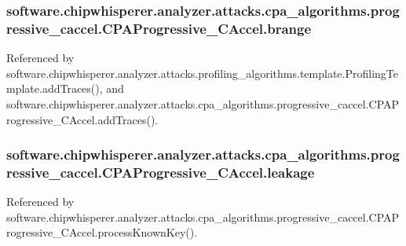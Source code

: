 \subsubsection[{brange}]{\setlength{\rightskip}{0pt plus 5cm}software.\+chipwhisperer.\+analyzer.\+attacks.\+cpa\+\_\+algorithms.\+progressive\+\_\+caccel.\+C\+P\+A\+Progressive\+\_\+\+C\+Accel.\+brange}\label{classsoftware_1_1chipwhisperer_1_1analyzer_1_1attacks_1_1cpa__algorithms_1_1progressive__caccel_1_1CPAProgressive__CAccel_a11fa06dd5d4fb9ad43dfd86c99d4bc9c}


Referenced by software.\+chipwhisperer.\+analyzer.\+attacks.\+profiling\+\_\+algorithms.\+template.\+Profiling\+Template.\+add\+Traces(), and software.\+chipwhisperer.\+analyzer.\+attacks.\+cpa\+\_\+algorithms.\+progressive\+\_\+caccel.\+C\+P\+A\+Progressive\+\_\+\+C\+Accel.\+add\+Traces().

\hypertarget{classsoftware_1_1chipwhisperer_1_1analyzer_1_1attacks_1_1cpa__algorithms_1_1progressive__caccel_1_1CPAProgressive__CAccel_aa6611e610a6298213394c8582dea50e5}{}
\subsubsection[{leakage}]{\setlength{\rightskip}{0pt plus 5cm}software.\+chipwhisperer.\+analyzer.\+attacks.\+cpa\+\_\+algorithms.\+progressive\+\_\+caccel.\+C\+P\+A\+Progressive\+\_\+\+C\+Accel.\+leakage}\label{classsoftware_1_1chipwhisperer_1_1analyzer_1_1attacks_1_1cpa__algorithms_1_1progressive__caccel_1_1CPAProgressive__CAccel_aa6611e610a6298213394c8582dea50e5}


Referenced by software.\+chipwhisperer.\+analyzer.\+attacks.\+cpa\+\_\+algorithms.\+progressive\+\_\+caccel.\+C\+P\+A\+Progressive\+\_\+\+C\+Accel.\+process\+Known\+Key().

\hypertarget{classsoftware_1_1chipwhisperer_1_1analyzer_1_1attacks_1_1cpa__algorithms_1_1progressive__caccel_1_1CPAProgressive__CAccel_a964c4e82ecc2fddc3bdd7836ee1146fa}{}
